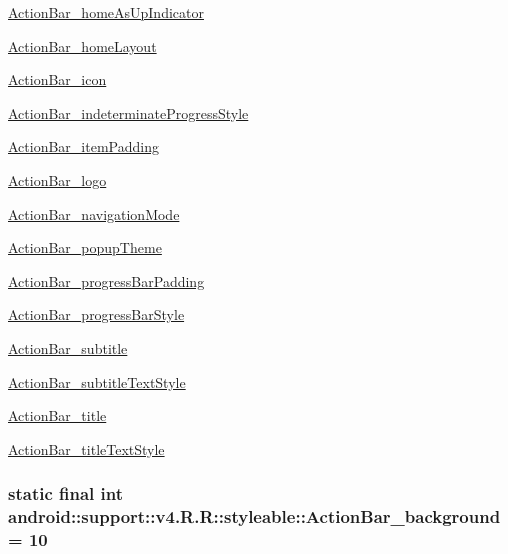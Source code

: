 \begin{Desc}
\hyperlink{classandroid_1_1support_1_1v4_1_1_r_1_1styleable_e0ce4cd42f818c233a5c824e297a6329}{ActionBar\_\-homeAsUpIndicator} 

\hyperlink{classandroid_1_1support_1_1v4_1_1_r_1_1styleable_5bac411a91b290a049eda35aa2ffac76}{ActionBar\_\-homeLayout} 

\hyperlink{classandroid_1_1support_1_1v4_1_1_r_1_1styleable_7ea505dc252b6d9f9dd2c9e6251d35fe}{ActionBar\_\-icon} 

\hyperlink{classandroid_1_1support_1_1v4_1_1_r_1_1styleable_a8a88b78aad97f680e3cbee4dd08ef23}{ActionBar\_\-indeterminateProgressStyle} 

\hyperlink{classandroid_1_1support_1_1v4_1_1_r_1_1styleable_10e74e1d287a83eeaec631e4753a9d2f}{ActionBar\_\-itemPadding} 

\hyperlink{classandroid_1_1support_1_1v4_1_1_r_1_1styleable_239d55172c67152fbf4c566f3de2f586}{ActionBar\_\-logo} 

\hyperlink{classandroid_1_1support_1_1v4_1_1_r_1_1styleable_57771890bb08e78ec220a5ffac58bd77}{ActionBar\_\-navigationMode} 

\hyperlink{classandroid_1_1support_1_1v4_1_1_r_1_1styleable_fbc82042283d6f161c64d06b055e15dc}{ActionBar\_\-popupTheme} 

\hyperlink{classandroid_1_1support_1_1v4_1_1_r_1_1styleable_86bc83c8961f6605b5d3fa0a1ae7ec1c}{ActionBar\_\-progressBarPadding} 

\hyperlink{classandroid_1_1support_1_1v4_1_1_r_1_1styleable_4d02536c4a498848e9b2a9223f011d73}{ActionBar\_\-progressBarStyle} 

\hyperlink{classandroid_1_1support_1_1v4_1_1_r_1_1styleable_b13c54236519fed1addd3ca8eb816d6d}{ActionBar\_\-subtitle} 

\hyperlink{classandroid_1_1support_1_1v4_1_1_r_1_1styleable_8ebb80bb063e0a82480659b40929e291}{ActionBar\_\-subtitleTextStyle} 

\hyperlink{classandroid_1_1support_1_1v4_1_1_r_1_1styleable_71731b8a49f4eb22e29277c675a98927}{ActionBar\_\-title} 

\hyperlink{classandroid_1_1support_1_1v4_1_1_r_1_1styleable_6a25d0e26442974dff249844cf2955a8}{ActionBar\_\-titleTextStyle} \end{Desc}
\hypertarget{classandroid_1_1support_1_1v4_1_1_r_1_1styleable_7d91fb5bbb5c3d2bc5aec28f9ed002b4}{
\subsubsection[{ActionBar\_\-background}]{\setlength{\rightskip}{0pt plus 5cm}static final int android::support::v4.R.R::styleable::ActionBar\_\-background = 10}}
\label{classandroid_1_1support_1_1v4_1_1_r_1_1styleable_7d91fb5bbb5c3d2bc5aec28f9ed002b4}



